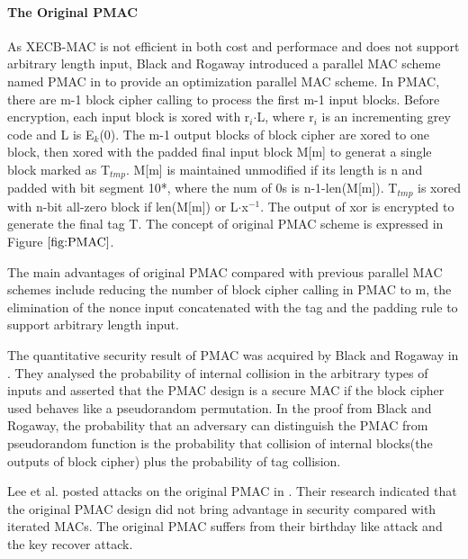 \documentclass{article}
\begin{document}
\paragraph{The Original PMAC}
As XECB-MAC is not efficient in both cost and performace and does not support arbitrary length input, Black and Rogaway introduced a parallel MAC scheme named PMAC in \cite{pmac} to provide an optimization parallel MAC scheme.  
In PMAC, there are m-1 block cipher calling to process the first m-1 input blocks. Before encryption, each input block is xored with r$_i$$\cdot$L, where r$_i$ is an incrementing grey code and L is E$_k$(0). The m-1 output blocks of block cipher are xored to one block, then xored with the padded final input block M[m] to generat a single block marked as T$_{tmp}$. M[m] is maintained unmodified if its length is n and padded with bit segment 10*, where the num of 0s is n-1-len(M[m]).  
T$_{tmp}$ is xored with n-bit all-zero block if len(M[m]) or L$\cdot$x$^{-1}$.  The output of xor is encrypted to generate the final tag T. The concept of original PMAC scheme is expressed in Figure $\ref{fig:PMAC}$. 

The main advantages of original PMAC compared with previous parallel MAC schemes include reducing the number of block cipher calling in PMAC to m, the elimination of the nonce input concatenated with the tag and the padding rule to support arbitrary length input.   

The quantitative security result of PMAC was acquired by Black and Rogaway in \cite{pmac}. They analysed the probability of internal collision in the arbitrary types of inputs and asserted that the PMAC design is a secure MAC if the block cipher used behaves like a pseudorandom permutation. In the proof from Black and Rogaway, the probability that an adversary can distinguish the PMAC from pseudorandom function is the probability that collision of internal blocks(the outputs of block cipher) plus the probability of tag collision. 

Lee et al. posted attacks on the original PMAC in \cite{pmac_forgery}. Their research indicated that the original PMAC design did not bring advantage in security compared with iterated MACs. The original PMAC suffers from their birthday like attack and the key recover attack.
\end{document}
